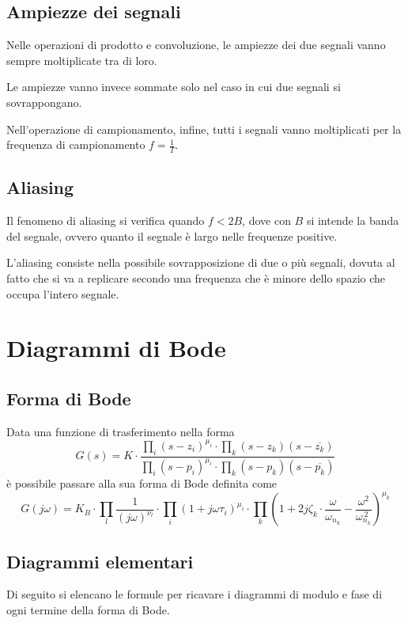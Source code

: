 \documentclass[a4paper,oneside,titlepage]{book}
\begin{document}
\section{Ampiezze dei segnali}
Nelle operazioni di prodotto e convoluzione, le ampiezze dei due segnali vanno sempre moltiplicate tra di loro.

Le ampiezze vanno invece sommate solo nel caso in cui due segnali si sovrappongano.

Nell'operazione di campionamento, infine, tutti i segnali vanno moltiplicati per la frequenza di campionamento $f = \frac{1}{T}$.

\section{Aliasing}
Il fenomeno di aliasing si verifica quando $f < 2B$, dove con $B$ si intende la banda del segnale, ovvero quanto il segnale è largo nelle frequenze positive.

L'aliasing consiste nella possibile sovrapposizione di due o più segnali, dovuta al fatto che si va a replicare secondo una frequenza che è minore dello spazio che occupa l'intero segnale.


\chapter{Diagrammi di Bode}

\section{Forma di Bode}
Data una funzione di trasferimento nella forma
\[ G(s) = K \cdot \frac{\prod_i (s-z_i)^{\mu_i} \cdot \prod_k (s-z_k)(s- \overline{z_k})}{\prod_i (s-p_i)^{\mu_i} \cdot \prod_k (s-p_k)(s- \overline{p_k})} \]
è possibile passare alla sua forma di Bode definita come
\[ G(j\omega) = K_B \cdot \prod_l \frac{1}{(j\omega)^{\nu_l}} \cdot \prod_i (1+j\omega \tau_i)^{\mu_i} \cdot \prod_k \left( 1+2j\zeta_k \cdot \frac{\omega}{\omega_{n_k}} - \frac{\omega^2}{\omega^{\,2}_{n_k}} \right)^{\mu_k} \]

\section{Diagrammi elementari}
Di seguito si elencano le formule per ricavare i diagrammi di modulo e fase di ogni termine della forma di Bode.
\end{document}
